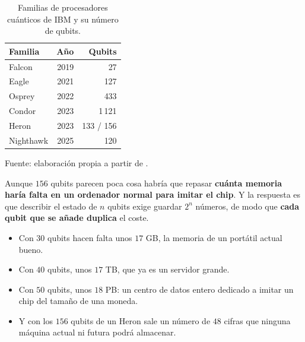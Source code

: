 \begin{table}[htbp]
    \centering
    \begin{tabular}{@{}lrr@{}}
        \toprule
        \textbf{Familia} & \textbf{Año} & \textbf{Qubits} \\
        \midrule
        Falcon    & 2019 & 27 \\
        Eagle     & 2021 & 127 \\
        Osprey    & 2022 & 433 \\
        Condor    & 2023 & 1\,121 \\
        Heron     & 2023 & 133 / 156 \\
        Nighthawk & 2025 & 120 \\
        \bottomrule
    \end{tabular}

    \caption{Familias de procesadores cuánticos de IBM y su número de qubits.}
    \label{tab:familias}

    {\footnotesize Fuente: elaboración propia a partir de .}
\end{table}


Aunque $156$ qubits parecen poca cosa habría que repasar \textbf{cuánta memoria haría falta en un ordenador normal
para imitar el chip}. Y la respuesta es que describir el estado de $n$ qubits exige guardar
$2^n$ números, de modo que \textbf{cada qubit que se añade duplica} el coste. 
\begin{itemize}
    \item Con $30$ qubits hacen falta unos $17$ GB, la memoria de un portátil actual bueno.
    \item  Con $40$ qubits, unos $17$ TB, que ya es un servidor grande.
    \item Con $50$ qubits, unos $18$ PB: un centro de datos entero dedicado a imitar un chip del tamaño de una moneda. 
    \item Y con los $156$ qubits de un Heron sale un número de $48$ cifras que ninguna máquina actual ni futura podrá almacenar.
\end{itemize}

